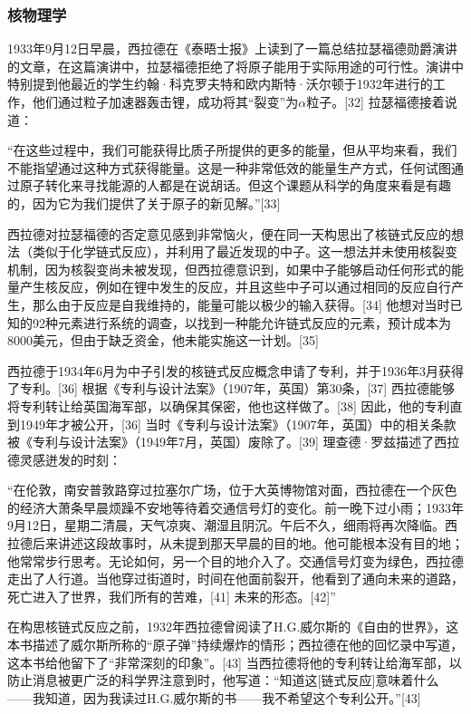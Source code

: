 \subsubsection{核物理学}  
1933年9月12日早晨，西拉德在《泰晤士报》上读到了一篇总结拉瑟福德勋爵演讲的文章，在这篇演讲中，拉瑟福德拒绝了将原子能用于实际用途的可行性。演讲中特别提到他最近的学生约翰·科克罗夫特和欧内斯特·沃尔顿于1932年进行的工作，他们通过粒子加速器轰击锂，成功将其“裂变”为\(\alpha\)粒子。[32] 拉瑟福德接着说道：

“在这些过程中，我们可能获得比质子所提供的更多的能量，但从平均来看，我们不能指望通过这种方式获得能量。这是一种非常低效的能量生产方式，任何试图通过原子转化来寻找能源的人都是在说胡话。但这个课题从科学的角度来看是有趣的，因为它为我们提供了关于原子的新见解。”[33]

西拉德对拉瑟福德的否定意见感到非常恼火，便在同一天构思出了核链式反应的想法（类似于化学链式反应），并利用了最近发现的中子。这一想法并未使用核裂变机制，因为核裂变尚未被发现，但西拉德意识到，如果中子能够启动任何形式的能量产生核反应，例如在锂中发生的反应，并且这些中子可以通过相同的反应自行产生，那么由于反应是自我维持的，能量可能以极少的输入获得。[34] 他想对当时已知的92种元素进行系统的调查，以找到一种能允许链式反应的元素，预计成本为8000美元，但由于缺乏资金，他未能实施这一计划。[35]

西拉德于1934年6月为中子引发的核链式反应概念申请了专利，并于1936年3月获得了专利。[36] 根据《专利与设计法案》（1907年，英国）第30条，[37] 西拉德能够将专利转让给英国海军部，以确保其保密，他也这样做了。[38] 因此，他的专利直到1949年才被公开，[36] 当时《专利与设计法案》（1907年，英国）中的相关条款被《专利与设计法案》（1949年7月，英国）废除了。[39] 理查德·罗兹描述了西拉德灵感迸发的时刻：

“在伦敦，南安普敦路穿过拉塞尔广场，位于大英博物馆对面，西拉德在一个灰色的经济大萧条早晨烦躁不安地等待着交通信号灯的变化。前一晚下过小雨；1933年9月12日，星期二清晨，天气凉爽、潮湿且阴沉。午后不久，细雨将再次降临。西拉德后来讲述这段故事时，从未提到那天早晨的目的地。他可能根本没有目的地；他常常步行思考。无论如何，另一个目的地介入了。交通信号灯变为绿色，西拉德走出了人行道。当他穿过街道时，时间在他面前裂开，他看到了通向未来的道路，死亡进入了世界，我们所有的苦难，[41] 未来的形态。[42]”

在构思核链式反应之前，1932年西拉德曾阅读了H.G.威尔斯的《自由的世界》，这本书描述了威尔斯所称的“原子弹”持续爆炸的情形；西拉德在他的回忆录中写道，这本书给他留下了“非常深刻的印象”。[43] 当西拉德将他的专利转让给海军部，以防止消息被更广泛的科学界注意到时，他写道：“知道这[链式反应]意味着什么——我知道，因为我读过H.G.威尔斯的书——我不希望这个专利公开。”[43]

